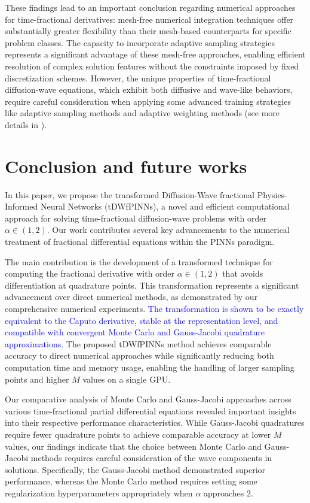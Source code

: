 \documentclass[preprint,3p,times]{elsarticle}
\newcommand{\revise}[1]{\textcolor{blue}{#1}}
\begin{document}
These findings lead to an important conclusion regarding numerical approaches for time-fractional derivatives: mesh-free numerical integration techniques offer substantially greater flexibility than their mesh-based counterparts for specific problem classes. The capacity to incorporate adaptive sampling strategies represents a significant advantage of these mesh-free approaches, enabling efficient resolution of complex solution features without the constraints imposed by fixed discretization schemes. However, the unique properties of time-fractional diffusion-wave equations, which exhibit both diffusive and wave-like behaviors, require careful consideration when applying some advanced training strategies like adaptive sampling methods and adaptive weighting methods (see more details in \cite{Wang2022:causality,WangYuParis:2022:NTK}).




\section{Conclusion and future works}
\label{sec:conclusion}
In this paper, we propose the transformed Diffusion-Wave fractional Physics-Informed Neural Networks (tDWfPINNs), a novel and efficient computational approach for solving time-fractional diffusion-wave problems with order $\alpha \in (1, 2)$. Our work contributes several key advancements to the numerical treatment of fractional differential equations within the PINNs paradigm.

 The main contribution is the development of a transformed technique for computing the fractional derivative with order $\alpha \in (1, 2)$ that avoids differentiation at quadrature points. This transformation represents a significant advancement over direct numerical methods, as demonstrated by our comprehensive numerical experiments. \revise{The transformation is shown to be exactly equivalent to the Caputo derivative, stable at the representation level, and compatible with convergent Monte Carlo and Gauss-Jacobi quadrature approximations.} The proposed tDWfPINNs method achieves comparable accuracy to direct numerical approaches while significantly reducing both computation time and memory usage, enabling the handling of larger sampling points and higher $M$ values on a single GPU.

Our comparative analysis of Monte Carlo and Gauss-Jacobi approaches across various time-fractional partial differential equations revealed important insights into their respective performance characteristics. While Gauss-Jacobi quadratures require fewer quadrature points to achieve comparable accuracy at lower $M$ values, our findings indicate that the choice between Monte Carlo and Gauss-Jacobi methods requires careful consideration of the wave components in solutions. Specifically, the Gauss-Jacobi method demonstrated superior performance, whereas the Monte Carlo method requires setting some regularization hyperparameters appropriately when $\alpha$ approaches 2. 
\end{document}

